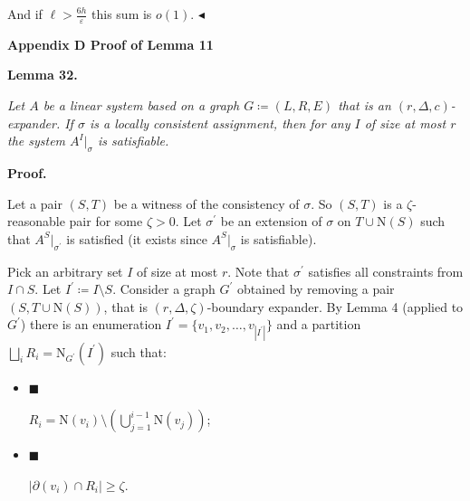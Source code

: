 \documentclass[10pt,a4paper]{article}
\begin{document}
And if $\ell>\frac{6h}{\varepsilon}$ this sum is $o(1)$.
$\blacktriangleleft$\par






\par\medskip\noindent\textbf{
Appendix D Proof of Lemma 11
}\par





\par\medskip\noindent\textbf{
\textbf{Lemma 32}\textbf{.}
}\par



\emph{Let $A$ be a linear system based on a graph $G\coloneqq(L,R,E)$ that is an $(r,\Delta,c)$-expander. If $\sigma$ is a locally consistent assignment, then for any $I$ of size at most $r$
the system $A^{I}|_{\sigma}$ is satisfiable.}\par






\par\medskip\noindent\textbf{Proof.}\par




Let a pair $(S,T)$ be a witness of the consistency of $\sigma$. So $(S,T)$ is a $\zeta$-reasonable
pair for some $\zeta>0$. Let $\sigma^{\prime}$ be an extension of $\sigma$ on $T\cup\mathrm{N}\left(S\right)$ such that
$A^{S}|_{\sigma^{\prime}}$ is satisfied (it exists since $A^{S}|_{\sigma}$ is satisfiable).\par




Pick an arbitrary set $I$ of size at most $r$. Note that $\sigma^{\prime}$ satisfies all constraints from $I\cap S$. Let $I^{\prime}\coloneqq I\setminus S$. Consider a graph $G^{\prime}$ obtained by removing a pair $(S,T\cup\mathrm{N}\left(S\right))$, that is $(r,\Delta,\zeta)$-boundary expander. By Lemma 4
(applied to $G^{\prime}$) there is an enumeration $I^{\prime}=\{v_{1},v_{2},\dots,v_{|I^{\prime}|}\}$ and a
partition $\bigsqcup\limits_{i}R_{i}=\mathrm{N}_{G^{\prime}}\left(I^{\prime}\right)$ such that:\par


\begin{itemize}


\item[] 
$\blacksquare$ 


$R_{i}=\mathrm{N}\left(v_{i}\right)\setminus\left(\bigcup\limits_{j=1}^{i-1}%
\mathrm{N}\left(v_{j}\right)\right)$;\par





\item[] 
$\blacksquare$ 


$|\partial(v_{i})\cap R_{i}|\geq\zeta$.\par





\end{itemize}
\end{document}
